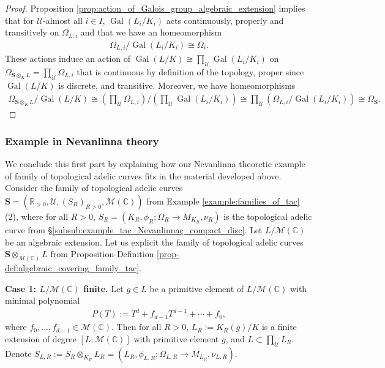 \documentclass [11pt,reqno]{amsart}
\def\bC{{\mathbb{C}}}
\def\bR{{\mathbb{R}}}
\newcommand{\1}{\mathmybb{1}}
\def\cM{{\mathcal{M}}}
\def\cU{{\mathcal{U}}}
\DeclareMathOperator{\Gal}{Gal}
\begin{document}
\begin{proof}
Proposition \ref{prop:action_of_Galois_group_algebraic_extension} implies that for $\cU$-almost all $i\in I$, $\Gal(L_{i}/K_{i})$ acts continuously, properly and transitively on $\Omega_{L,i}$ and that we have an homeomorphism
\begin{align*}
\Omega_{L,i}/\Gal(L_{i}/K_{i}) \cong \Omega_{i}.
\end{align*}
These actions induce an action of $\Gal(L/K)\cong \prod_{\cU}\Gal(L_{i}/K_{i})$ on $\Omega_{\mathbf{S}\otimes_{K}L}=\prod_{\cU}\Omega_{L,i}$ that is continuous by definition of the topology, proper since $\Gal(L/K)$ is discrete, and transitive. Moreover, we have homeomorphisms
\begin{align*}
\Omega_{\mathbf{S}\otimes_{K}L}/\Gal(L/K) \cong \displaystyle \left(\prod_{\cU}\Omega_{L,i}\right)/\left(\prod_{\cU}\Gal(L_{i}/K_{i})\right) \cong \prod_{\cU}\left(\Omega_{L,i}/\Gal(L_{i}/K_{i})\right) \cong \Omega_{\mathbf{S}}.
\end{align*}
\end{proof}

\subsubsection{Example in Nevanlinna theory}
\label{subsub:covering_family_topological_adelic_curves_Nevanlinna}

We conclude this first part by explaining how our Nevanlinna theoretic example of family of topological adelic curves fits in the material developed above. Consider the family of topological adelic curves $\mathbf{S}=(\bR_{>0},\cU,(S_{R})_{R>0},\cM(\bC))$ from Example \ref{example:families_of_tac} (2), where for all $R>0$, $S_{R}=(K_{R},\phi_{R}:\Omega_{R}\to M_{K_{R}},\nu_{R})$ is the topological adelic curve from \S \ref{subsub:example_tac_Nevanlinnaç_compact_disc}. Let $L/\cM(\bC)$ be an algebraic extension. Let us explicit the family of topological adelic curves $\mathbf{S}\otimes_{\cM(\bC)}L$ from Proposition-Definition \ref{prop-def:algebraic_covering_family_tac}.

\textbf{Case 1: $L/\cM(\bC)$ finite.} Let $g\in L$ be a primitive element of $L/\cM(\bC)$ with minimal polynomial
\begin{align*}
P(T) := T^{d}+f_{d-1}T^{d-1}+\cdots+f_{0},
\end{align*} 
where $f_{0},...,f_{d-1}\in \cM(\bC)$. Then for all $R>0$, $L_{R}:=K_{R}(g)/K$ is a finite extension of degree $[L:\cM(\bC)]$ with primitive element $g$, and $L \subset \prod_{\cU}L_{R}$. Denote $S_{L,R}:=S_{R}\otimes_{K_{R}}L_{R}=(L_{R},\phi_{L,R}:\Omega_{L,R}\to M_{L_{R}},\nu_{L,R})$.
\end{document}
